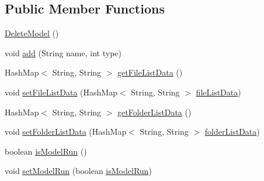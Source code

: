 \subsection*{Public Member Functions}
\begin{DoxyCompactItemize}
\item 
\hyperlink{classcom_1_1poly_1_1nlp_1_1filekommander_1_1views_1_1models_1_1_delete_model_a3aa7255e76c7d45c498f27081c88771d}{Delete\-Model} ()
\item 
void \hyperlink{classcom_1_1poly_1_1nlp_1_1filekommander_1_1views_1_1models_1_1_delete_model_a47c3cea5a0d49c533cf5e11352941d5f}{add} (String name, int type)
\item 
Hash\-Map$<$ String, String $>$ \hyperlink{classcom_1_1poly_1_1nlp_1_1filekommander_1_1views_1_1models_1_1_delete_model_aad3938fe6c62b7113b7266f67e1882d5}{get\-File\-List\-Data} ()
\item 
void \hyperlink{classcom_1_1poly_1_1nlp_1_1filekommander_1_1views_1_1models_1_1_delete_model_a5cadddfa5dbd0921b7868298275e8880}{set\-File\-List\-Data} (Hash\-Map$<$ String, String $>$ \hyperlink{classcom_1_1poly_1_1nlp_1_1filekommander_1_1views_1_1models_1_1_delete_model_a3ff23db5a93631b8e56d9797fad7a866}{file\-List\-Data})
\item 
Hash\-Map$<$ String, String $>$ \hyperlink{classcom_1_1poly_1_1nlp_1_1filekommander_1_1views_1_1models_1_1_delete_model_a72036e220f6f039b1caba1354ef7aa9a}{get\-Folder\-List\-Data} ()
\item 
void \hyperlink{classcom_1_1poly_1_1nlp_1_1filekommander_1_1views_1_1models_1_1_delete_model_a07ac8800ed6531001f3a2929b08f32d1}{set\-Folder\-List\-Data} (Hash\-Map$<$ String, String $>$ \hyperlink{classcom_1_1poly_1_1nlp_1_1filekommander_1_1views_1_1models_1_1_delete_model_a4152e1b4fc47f32d0bcc2793da662ab9}{folder\-List\-Data})
\item 
boolean \hyperlink{classcom_1_1poly_1_1nlp_1_1filekommander_1_1views_1_1models_1_1_delete_model_a241ec31c33f6f7b1d00bc9011c702bb8}{is\-Model\-Run} ()
\item 
void \hyperlink{classcom_1_1poly_1_1nlp_1_1filekommander_1_1views_1_1models_1_1_delete_model_a0c5593c30f48ee4afb38a0c9ab99a01d}{set\-Model\-Run} (boolean \hyperlink{classcom_1_1poly_1_1nlp_1_1filekommander_1_1views_1_1models_1_1_delete_model_a539d8d947cd5217ffb0ba4dfd1e7661d}{is\-Model\-Run})
\end{DoxyCompactItemize}
